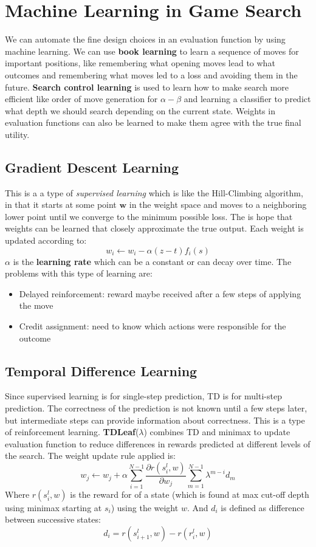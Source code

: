 \documentclass[twoside]{article}
\begin{document}
\section{Machine Learning in Game Search}
We can automate the fine design choices in an evaluation function by using 
machine learning. We can use \textbf{book learning} to learn a sequence of
moves for important positions, like remembering what opening moves lead to 
what outcomes and remembering what moves led to a loss and avoiding them in
the future. \textbf{Search control learning} is used to learn how to make
search more efficient like order of move generation for \(\alpha-\beta\) and
learning a classifier to predict what depth we should search depending on the
current state. Weights in evaluation functions can also be learned to make
them agree with the true final utility.
\subsection{Gradient Descent Learning}
This is a a type of \emph{supervised learning} which is like the Hill-Climbing
algorithm, in that it starts at some point \(\mathbf w\) in the weight space and moves
to a neighboring lower point until we converge to the minimum possible loss.
The is hope that weights can be learned that closely approximate the true output.
Each weight is updated according to:
\begin{equation}
        w_i \leftarrow w_i - \alpha (z - t)f_i(s)
\end{equation}
\(\alpha\) is the \textbf{learning rate} which can be a constant or can decay
over time. The problems with this type of learning are:
\begin{itemize}
        \item Delayed reinforcement: reward maybe received after a few steps
        of applying the move
        \item Credit assignment: need to know which actions were responsible
        for the outcome
\end{itemize}
\subsection{Temporal Difference Learning}
Since supervised learning is for single-step prediction, TD is for multi-step
prediction. The correctness of the prediction is not known until a few steps
later, but intermediate steps can provide information about correctness. This
is a type of reinforcement learning. \textbf{TDLeaf}(\(\lambda\)) combines TD
and minimax to update evaluation function to reduce differences in rewards 
predicted at different levels of the search. The weight update rule applied is:
\begin{equation}
        w_j \leftarrow w_j + \alpha \sum_{i=1}^{N-1}\frac{\partial r(s_i^l, w)}{\partial w_j}\sum_{m=1}^{N-1}\lambda^{m-i}d_m
\end{equation}
Where \(r(s^l_i, w)\) is the reward for of a state (which is found at max cut-off
depth using minimax starting at \(s_i\)) using the weight \(w\). And \(d_i\) is
defined as difference between successive states:
\begin{equation}
        d_i = r(s^l_{i+1}, w) - r(r^l_i, w)
\end{equation}
\end{document}
